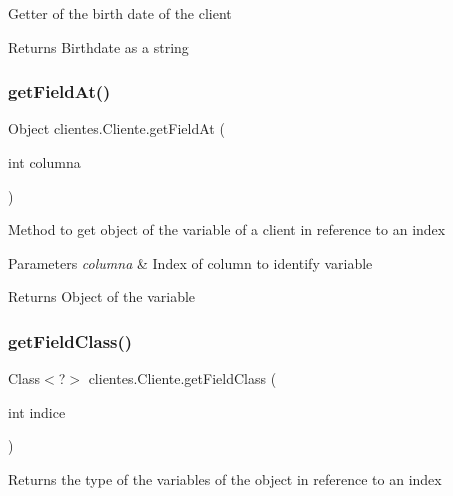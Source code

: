 Getter of the birth date of the client

\begin{DoxyReturn}{Returns}
Birthdate as a string 
\end{DoxyReturn}
\mbox{\label{classclientes_1_1_cliente_a7ec404ddfce7ca5c70e85f005988edc3}} 
\subsubsection{\texorpdfstring{get\+Field\+At()}{getFieldAt()}}
{\footnotesize\ttfamily Object clientes.\+Cliente.\+get\+Field\+At (\begin{DoxyParamCaption}\item[{int}]{columna }\end{DoxyParamCaption})\hspace{0.3cm}{\ttfamily [inline]}}

Method to get object of the variable of a client in reference to an index


\begin{DoxyParams}{Parameters}
{\em columna} & Index of column to identify variable \\
\hline
\end{DoxyParams}
\begin{DoxyReturn}{Returns}
Object of the variable 
\end{DoxyReturn}
\mbox{\label{classclientes_1_1_cliente_a8c76bd0b8a714475bac4a132e481daec}} 
\subsubsection{\texorpdfstring{get\+Field\+Class()}{getFieldClass()}}
{\footnotesize\ttfamily Class$<$?$>$ clientes.\+Cliente.\+get\+Field\+Class (\begin{DoxyParamCaption}\item[{int}]{indice }\end{DoxyParamCaption})\hspace{0.3cm}{\ttfamily [inline]}}

Returns the type of the variables of the object in reference to an index


